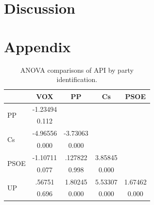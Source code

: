 \documentclass[a4paper, svgnames]{article}
\begin{document}
\section{Discussion}



\newpage




\newpage

\section{Appendix}
\label{appendix}
\begin{table}[H]
	\centering
	\caption{ANOVA comparisons of API by party identification.}
	\label{tab:anova-parties}
	\begin{tabular}{@{}lcccc@{}}
		\toprule
		                      & VOX      & PP       & Cs      & PSOE    \\ \midrule
		\multirow{2}{*}{PP}   & -1.23494 &          &         &         \\
		                      & 0.112    &          &         &         \\
		\multirow{2}{*}{Cs}   & -4.96556 & -3.73063 &         &         \\
		                      & 0.000    & 0.000    &         &         \\
		\multirow{2}{*}{PSOE} & -1.10711 & .127822  & 3.85845 &         \\
		                      & 0.077    & 0.998    & 0.000   &         \\
		\multirow{2}{*}{UP}   & .56751   & 1.80245  & 5.53307 & 1.67462 \\
		                      & 0.696    & 0.000    & 0.000   & 0.000   \\ \bottomrule
	\end{tabular}
\end{table}
\end{document}

